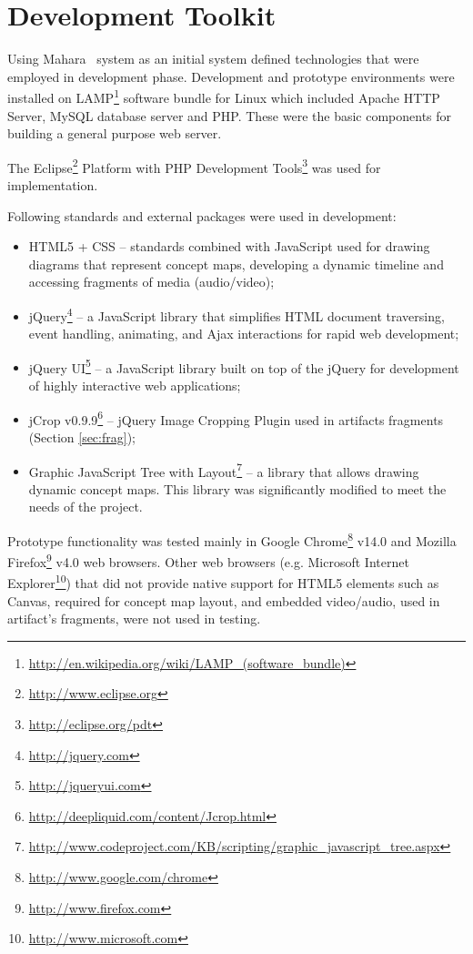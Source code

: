 \section{Development Toolkit}

Using Mahara \ep~system as an initial system defined technologies that were
employed in development phase. Development and prototype environments were
installed on LAMP\footnote{\url{http://en.wikipedia.org/wiki/LAMP_(software_bundle)}}
software bundle for Linux which included Apache HTTP Server, MySQL database
server and PHP. These were the basic components for building a general purpose
web server.

The Eclipse\footnote{\url{http://www.eclipse.org}} Platform with PHP Development
Tools\footnote{\url{http://eclipse.org/pdt}} was used for implementation.

Following standards and external packages were used in development:

\begin{itemize}

\item HTML5 + CSS -- standards combined with JavaScript used for drawing
diagrams that represent concept maps, developing a dynamic timeline and
accessing fragments of media (audio/video);

\item jQuery\footnote{\url{http://jquery.com}} -- a JavaScript library that
simplifies HTML document traversing, event handling, animating, and Ajax
interactions for rapid web development;

\item jQuery UI\footnote{\url{http://jqueryui.com}} -- a JavaScript library
built on top of the jQuery for development of highly interactive web applications;

\item jCrop v0.9.9\footnote{\url{http://deepliquid.com/content/Jcrop.html}}
-- jQuery Image Cropping Plugin used in artifacts fragments (Section
\ref{sec:frag});

\item Graphic JavaScript Tree with
Layout\footnote{\url{http://www.codeproject.com/KB/scripting/graphic_javascript_tree.aspx}}
-- a library that allows drawing dynamic concept maps. This library was
significantly modified to meet the needs of the project.
\end{itemize}

Prototype functionality was tested mainly in Google
Chrome\footnote{\url{http://www.google.com/chrome}} v14.0 and Mozilla
Firefox\footnote{\url{http://www.firefox.com}} v4.0 web browsers. Other web
browsers (e.g. Microsoft Internet
Explorer\footnote{\url{http://www.microsoft.com}}) that did not provide native
support for HTML5 elements such as Canvas, required for concept map layout, and
embedded video/audio, used in artifact's fragments, were not used in testing.


